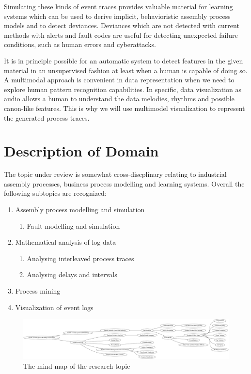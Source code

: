 \documentclass[a4paper,10pt]{article}
\begin{document}
Simulating these kinds of event traces provides valuable material for learning systems which can be used to derive implicit, behavioristic assembly process models and
to detect deviances. Deviances which are not detected with current methods with alerts and fault codes are useful for detecting unexpected failure conditions, such as
human errors and cyberattacks.

It is in principle possible for an automatic system to detect features in the given material in an unsupervised fashion at least when a human is capable of doing so.
A multimodal approach is convenient in data representation when we need to explore human pattern recognition capabilities. In specific, data visualization as audio
allows a human to understand the data melodies, rhythms and possible canon-like features. This is why we will use multimodel visualization to represent the generated
process traces.

\section{Description of Domain}

The topic under review is somewhat cross-discplinary relating to industrial assembly processes, business process modelling and learning systems.
Overall the following subtopics are recognized:
\begin{enumerate}
 \item Assembly process modelling and simulation
   \begin{enumerate}
     \item Fault modelling and simulation
   \end{enumerate}
 \item Mathematical analysis of log data
   \begin{enumerate}
     \item Analysing interleaved process traces
     \item Analysing delays and intervals
   \end{enumerate}
 \item Process mining
 \item Visualization of event logs
\end{enumerate}

\begin{figure}[ht]
\begin{center}
 \includegraphics[width=\textwidth]{./field.png}
\end{center}
\caption{The mind map of the research topic}
\end{figure} 
\end{document}
